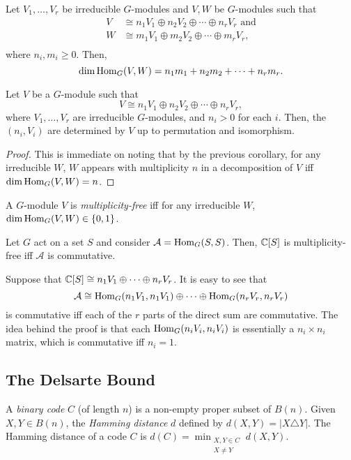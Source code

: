 	\begin{fcor}
		Let $V_1,\ldots,V_r$ be irreducible $G$-modules and $V,W$ be $G$-modules such that
		\begin{align*}
			V &\cong n_1V_1 \oplus n_2V_2 \oplus \cdots \oplus n_rV_r \text{ and} \\
			W &\cong m_1V_1 \oplus m_2V_2 \oplus \cdots \oplus m_rV_r, \\
		\end{align*} 
		where $n_i,m_i \ge 0$. Then,
		\[ \dim \operatorname{Hom}_G(V,W) = n_1m_1 + n_2m_2 + \cdots + n_rm_r. \]
	\end{fcor}

	\begin{fcor}
		Let $V$ be a $G$-module such that
		\[ V \cong n_1V_1 \oplus n_2V_2 \oplus \cdots \oplus n_rV_r, \]
		where $V_1,\ldots,V_r$ are irreducible $G$-modules, and $n_i > 0$ for each $i$. Then, the $(n_i,V_i)$ are determined by $V$ up to permutation and isomorphism. 
	\end{fcor}
	\begin{proof}
		This is immediate on noting that by the previous corollary, for any irreducible $W$, $W$ appears with multiplicity $n$ in a decomposition of $V$ iff $\dim \operatorname{Hom}_G(V,W) = n$.
	\end{proof}

	\begin{fdef}
		A $G$-module $V$ is \emph{multiplicity-free} iff for any irreducible $W$, $\dim \operatorname{Hom}_G(V,W) \in \{0,1\}$.
	\end{fdef}

	\begin{flem}
		\label{lem:multiplicity-free}
		Let $G$ act on a set $S$ and consider $\mathcal{A} = \operatorname{Hom}_G(S,S)$. Then, $\mathbb{C}[S]$ is multiplicity-free iff $\mathcal{A}$ is commutative.
	\end{flem}
	Suppose that $\mathbb{C}[S] \cong n_1 V_1 \oplus \cdots \oplus n_r V_r$. It is easy to see that
	\[ \mathcal{A} \cong \operatorname{Hom}_G(n_1 V_1, n_1 V_1) \oplus \cdots \oplus \operatorname{Hom}_G(n_r V_r, n_r V_r) \]
	is commutative iff each of the $r$ parts of the direct sum are commutative. The idea behind the proof is that each $\operatorname{Hom}_G(n_i V_i, n_i V_i)$ is essentially a $n_i \times n_i$ matrix, which is commutative iff $n_i = 1$.

\subsection{The Delsarte Bound}

	\begin{fdef}
		A \emph{binary code} $C$ (of length $n$) is a non-empty proper subset of $B(n)$. Given $X,Y \in B(n)$, the \emph{Hamming distance} $d$ defined by $d(X,Y) = |X \triangle Y|$. The Hamming distance of a code $C$ is $d(C) = \min_{\substack{X,Y \in C \\ X \ne Y}} d(X,Y)$.
	\end{fdef}

